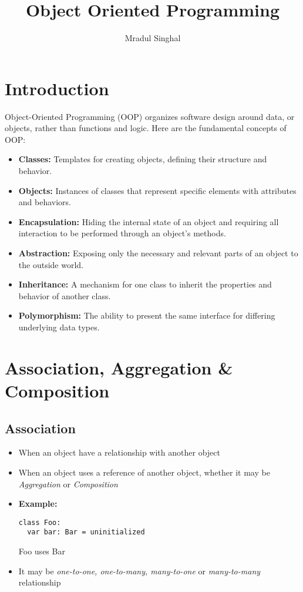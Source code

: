 \documentclass{article}
\title{Object Oriented Programming}
\author{Mradul Singhal}
\begin{document}
\maketitle
\newpage

\tableofcontents
\newpage

\section{Introduction}
Object-Oriented Programming (OOP) organizes software design around data, or objects, rather than functions and logic. Here are the fundamental concepts of OOP:
\begin{itemize}
    \item \textbf{Classes:} Templates for creating objects, defining their structure and behavior.
    \item \textbf{Objects:} Instances of classes that represent specific elements with attributes and behaviors.
    \item \textbf{Encapsulation:} Hiding the internal state of an object and requiring all interaction to be performed through an object's methods.
    \item \textbf{Abstraction:} Exposing only the necessary and relevant parts of an object to the outside world.
    \item \textbf{Inheritance:} A mechanism for one class to inherit the properties and behavior of another class.
    \item \textbf{Polymorphism:} The ability to present the same interface for differing underlying data types.
\end{itemize}
\newpage

\section{Association, Aggregation \& Composition}
\subsection{Association}
\begin{itemize}
    \item When an object have a relationship with another object
    \item When an object uses a reference of another object, whether it may be \textit{Aggregation} or \textit{Composition}
    \item \textbf{Example:}
          \begin{verbatim}
class Foo:
  var bar: Bar = uninitialized
          \end{verbatim}
          Foo uses Bar
    \item It may be \textit{one-to-one, one-to-many, many-to-one} or \textit{many-to-many} relationship
\end{itemize}
\end{document}

